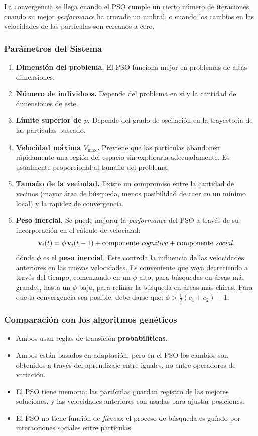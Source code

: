 \documentclass[10pt,a4paper]{article}
\begin{document}
La convergencia se llega cuando el PSO cumple un cierto número de iteraciones, cuando su mejor \textit{performance} ha cruzado un umbral, o cuando los cambios en las velocidades de las partículas son cercanos a cero.

\subsubsection{Parámetros del Sistema}

\begin{enumerate}
\item \textbf{Dimensión del problema.} El PSO funciona mejor en problemas de altas dimensiones.
\item \textbf{Número de individuos.} Depende del problema en sí y la cantidad de dimensiones de este.
\item \textbf{Límite superior de $p$.} Depende del grado de oscilación en la trayectoria de las partículas buscado.
\item \textbf{Velocidad máxima $V_{\max}$.} Previene que las partículas abandonen rápidamente una región del espacio sin explorarla adecuadamente. Es usualmente proporcional al tamaño del problema.
\item \textbf{Tamaño de la vecindad.} Existe un compromiso entre la cantidad de vecinos (mayor área de búsqueda, menos posibilidad de caer en un mínimo local) y la rapidez de convergencia.
\item \textbf{Peso inercial.} Se puede mejorar la \textit{performance} del PSO a través de su incorporación en el cálculo de velocidad:
\[
\mathbf{v}_{i}(t) = \phi \, \mathbf{v}_{i}(t-1) + \text{componente \textit{cognitiva}} + \text{componente \textit{social}}.
\]
dónde $\phi$ es el \textbf{peso inercial}. Este controla la influencia de las velocidades anteriores en las nuevas velocidades. Es conveniente que vaya decreciendo a través del tiempo, comenzando en un $\phi$ alto, para búsquedas en áreas más grandes, hasta un $\phi$ bajo, para refinar la búsqueda en áreas más chicas. Para que la convergencia sea posible, debe darse que: $\phi > \frac{1}{2} (c_1 + c_2) - 1$.
\end{enumerate}

\subsubsection{Comparación con los algoritmos genéticos}

\begin{itemize}
\item Ambos usan reglas de transición \textbf{probabilíticas}.
\item Ambos están  basados en adaptación, pero en el PSO los cambios son obtenidos a través del aprendizaje entre iguales, no entre operadores de variación.
\item El PSO tiene memoria: las partículas guardan registro de las mejores soluciones, y las velocidades anteriores son usadas para ajustar posiciones.
\item El PSO no tiene función de \textit{fitness}: el proceso de búsqueda es guíado por interacciones sociales entre partículas.
\end{itemize}
\end{document}
